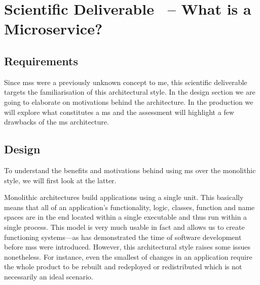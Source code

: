 \section{Scientific Deliverable \thesdel\ -- What is a Microservice?}
\label{sd:ms}


\subsection{Requirements}%

Since \glspl{ms} were a previously unknown concept to me, this
scientific deliverable targets the familiarisation of this
architectural style. In the design section we are going to elaborate
on motivations behind the architecture.  In the production we will
explore what constitutes a \gls{ms} and the assessment will highlight
a few drawbacks of the \gls{ms} architecture.

\subsection{Design}%

To understand the benefits and motivations behind using \gls{ms} over
the monolithic style, we will first look at the latter.
\cite{ms-definition}

Monolithic architectures build applications using a single unit. This
basically means that all of an application's functionality, logic,
classes, function and name spaces are in the end located within a
single executable and thus run within a single process.
\cite{ms-definition} This model is very much usable in fact and allows
us to create functioning systems---as has demonstrated the time of
software development before \glspl{ms} were introduced. However, this
architectural style raises some issues nonetheless. For instance, even
the smallest of changes in an application require the whole product to
be rebuilt and redeployed or redistributed which is not necessarily an
ideal scenario.

